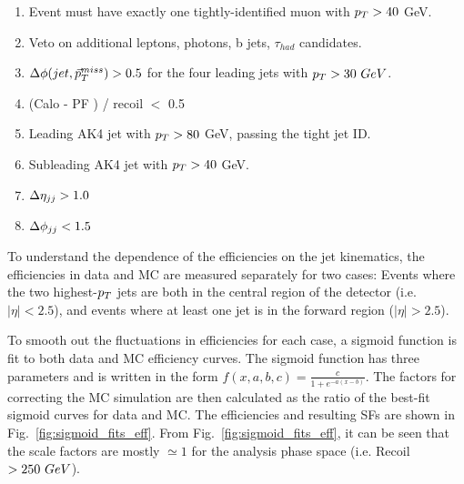 \begin{enumerate}
    \item Event must have exactly one tightly-identified muon with $p_T > 40$ GeV.
    \item Veto on additional leptons, photons, b jets, $\tau_{had}$ candidates.
    \item $\Delta\phi(jet,\vec{p}_{T}^{miss})>0.5$ for the four leading jets with $p_T>30~GeV$.
    \item (Calo \ptmiss - PF \ptmiss) / recoil $<$ 0.5
    \item Leading AK4 jet with $p_T>80$ GeV, passing the tight jet ID.
    \item Subleading AK4 jet with $p_T>40$ GeV.
    \item $\Delta \eta_{jj} > 1.0$
    \item $\Delta \phi_{jj} < 1.5$
\end{enumerate}

To understand the dependence of the efficiencies on the jet kinematics, the efficiencies in data and MC are measured 
separately for two cases: Events where the two highest-$p_T$ jets are both in the central region of the detector (i.e. $|\eta| < 2.5$), 
and events where at least one jet is in the forward region ($|\eta| > 2.5$).

To smooth out the fluctuations in efficiencies for each case, a sigmoid function is fit to both data and MC 
efficiency curves. The sigmoid function has three parameters and is written in the form $f(x,a,b,c) = \frac{c}{1+e^{-a(x-b)}}$. 
The factors for correcting the MC simulation are then calculated as the ratio of the best-fit sigmoid curves for data and MC.
The efficiencies and resulting SFs are shown in Fig.~\ref{fig:sigmoid_fits_eff}. From Fig.~\ref{fig:sigmoid_fits_eff}, 
it can be seen that the scale factors are mostly $\simeq 1$ for the analysis phase space (i.e. Recoil $> 250~GeV$).

